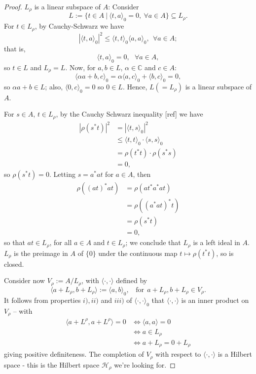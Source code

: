 \documentclass[12pt,a4paper]{amsart}
\theoremstyle{plain}
\theoremstyle{definition}
\newcommand{\Hr}{\mathcal{H}_\rho}
\newcommand{\1}{\mathbbm{1}}
\begin{document}
\begin{proof}
	$L_\rho$ is  a linear subspace of $A$: Consider  %
	\[
		L:= \{t \in A  ~|~ \langle t,a \rangle _0 = 0, ~\forall a \in A \}\subseteq L_\rho.
	\]
	For $t \in L_\rho$, by Cauchy-Schwarz we have 
	\[ 
		|\langle t,a \rangle_0|^2 \leq \langle t,t \rangle_0 \langle a,a\rangle_0,~~ \forall a \in A;
	\]
	that is,
	\[
		\langle t,a \rangle _0 = 0, ~~~ \forall a \in A,
	\]
	so $t\in L$ and $L_\rho =L$.
	Now, for $a,b \in L$, $\alpha \in \mathbb{C}$ and $c \in A$:
	\[
		\langle \alpha a + b, c \rangle _0 = \alpha \langle a,c \rangle _0 + \langle b,c\rangle _0 = 0,
	\]
	so $\alpha a +b \in L$; also, $\langle 0,c\rangle _0 = 0$ so $0 \in L$. 
	Hence, $L ( =L_\rho ) $ is a linear subspace of $A$.
	
	For $s \in A$, $t\in L_\rho$, by the Cauchy Schwarz inequality [ref] we have 
	\begin{align*}
		|\rho (s^\ast t) |^2 
		&= 		|\langle t,s\rangle_0 |^2 									\\
		&\leq 	\langle t,t\rangle_0 \cdot \langle s,s\rangle_0  			\\
		&= 		\rho (t^\ast t) \cdot \rho (s^\ast s)						\\
		&=		0,
	\end{align*}
	so $\rho (s^\ast t) = 0$. Letting $s = a^\ast a t$ for $a \in A$, then
	\begin{align*}
		\rho ((at)^\ast at) 
		&= 		\rho (at^\ast a^\ast at) 									\\
		&= 		\rho ((a^\ast at)^\ast t) 									\\
		&= 		\rho (s^\ast t) 											\\
		&=		0,
	\end{align*}
	so that $at \in L_\rho$, for all $a \in A$ and $t \in L_\rho$; 
	we conclude that $L_\rho$ is a left ideal in $A$.
	$L_\rho$ is  the preimage in $A$ of $\{0\}$ under the continuous map%
	$t \mapsto \rho (t^\ast t)$, so is closed.
	
	Consider now $V_\rho := A / L_\rho$, with $\langle \cdot,\cdot\rangle$ defined by 
	\[
		\langle a+L_\rho,b+L_\rho \rangle := \langle a,b\rangle_0, ~~~~ 
		\mbox{for}~~a+L_\rho,b+L_\rho \in V_\rho.
	\]
	It follows from properties $i),ii)$ and $iii)$ of $\langle \cdot,\cdot  \rangle _0$ that
	$\langle \cdot,\cdot  \rangle$ is an inner product on $V_\rho$ -- with
	\begin{align*}
				\langle a + L^\rho, a + L^\rho \rangle = 0
		&\iff 	\langle a,a\rangle=0										\\
		&\iff 	a \in L_\rho												\\
		&\iff 	a+L_\rho = 0+L_\rho
	\end{align*}
	giving positive definiteness.
	The completion of $V_\rho$ with respect to $\langle \cdot,\cdot  \rangle$ is a Hilbert space -
	this is the Hilbert space $\Hr$ we're looking for.
	

\end{proof}
\end{document}
